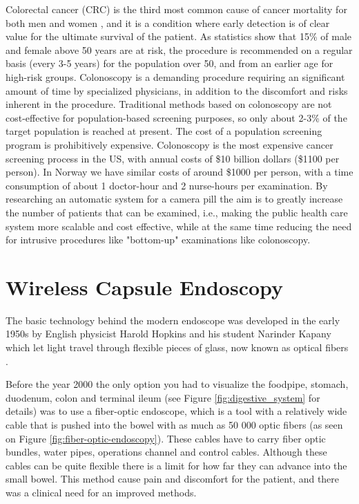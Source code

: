 \documentclass[english, a4paper]{article}
\begin{document}
Colorectal cancer (CRC) is the third most common cause of cancer mortality for both men and women \cite{CancerStatistics10}, and it is a condition where early detection is of clear value for the ultimate survival of the patient. As statistics show that 15\% of male and female above 50 years are at risk, the procedure is recommended on a regular basis (every 3-5 years) for the population over 50, and from an earlier age for high-risk groups. Colonoscopy is a demanding procedure requiring an significant amount of time by specialized physicians, in addition to the discomfort and risks inherent in the procedure. Traditional methods based on colonoscopy are not cost-effective for population-based screening purposes, so only about 2-3\% of the target population is reached at present. The cost of a population screening program is prohibitively expensive. Colonoscopy is the most expensive cancer screening process in the US, with annual costs of \$10 billion dollars (\$1100 per person). In Norway we have similar costs of around \$1000 per person, with a time consumption of about 1 doctor-hour and 2 nurse-hours per examination. By researching an automatic system for a camera pill the aim is to greatly increase the number of patients that can be examined, i.e., making the public health care system more scalable and cost effective, while at the same time reducing the need for intrusive procedures like "bottom-up" examinations like colonoscopy.




\section{Wireless Capsule Endoscopy}  \label{wireless_capsule_endoscopy}
The basic technology behind the modern endoscope was developed in the early 1950s by English physicist Harold Hopkins and his student Narinder Kapany which let light travel through flexible pieces of glass, now known as optical fibers \cite{NewMethod54}.

Before the year 2000 the only option you had to visualize the foodpipe, stomach, duodenum, colon and terminal ileum (see Figure \ref{fig:digestive_system} for details) was to use a fiber-optic endoscope, which is a tool with a relatively wide cable that is pushed into the bowel with as much as 50 000 optic fibers (as seen on Figure \ref{fig:fiber-optic-endoscopy}). These cables have to carry fiber optic bundles, water pipes, operations channel and control cables. Although these cables can be quite flexible there is a limit for how far they can advance into the small bowel. This method cause pain and discomfort for the patient, and there was a clinical need for an improved methods.
\end{document}

